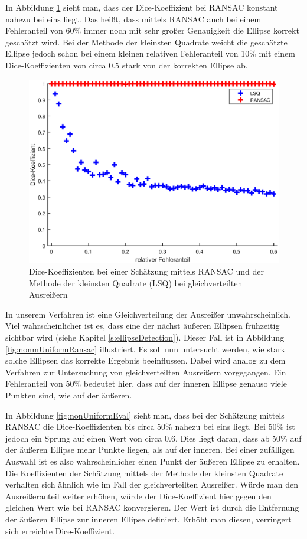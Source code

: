 {In Abbildung \ref{fig:uniformEval} sieht man, dass der Dice-Koeffizient bei RANSAC konstant nahezu bei eins liegt. Das heißt, dass mittels RANSAC auch bei einem Fehleranteil von 60\% immer noch mit sehr großer Genauigkeit die Ellipse korrekt geschätzt wird. Bei der Methode der kleinsten Quadrate weicht die geschätzte Ellipse jedoch schon bei einem kleinen relativen Fehleranteil von 10\% mit einem Dice-Koeffizienten von circa $0.5$ stark von der korrekten Ellipse ab.


\begin{figure}[!htb]
	\centering
	\includegraphics[width=\textwidth]{images/ransacEval0.eps}
	\caption{Dice-Koeffizienten bei einer Schätzung mittels RANSAC und der Methode der kleinsten Quadrate (LSQ) bei gleichverteilten Ausreißern}
	\label{fig:uniformEval}
\end{figure}

In unserem Verfahren ist eine Gleichverteilung der Ausreißer unwahrscheinlich. Viel wahrscheinlicher ist es, dass eine der nächst äußeren Ellipsen frühzeitig sichtbar wird (siehe Kapitel \ref{s:ellipseDetection}).
Dieser Fall ist in Abbildung \ref{fig:nonmUniformRansac} illustriert. Es soll nun untersucht werden, wie stark solche Ellipsen das korrekte Ergebnis beeinflussen. Dabei wird analog zu dem Verfahren zur Untersuchung von gleichverteilten Ausreißern vorgegangen. Ein Fehleranteil von 50\% bedeutet hier, dass auf der inneren Ellipse genauso viele Punkten sind, wie auf der äußeren.

In Abbildung \ref{fig:nonUniformEval} sieht man, dass bei der Schätzung mittels RANSAC die Dice-Koeffizienten bis circa 50\% nahezu bei eins liegt. Bei 50\% ist jedoch ein Sprung auf einen Wert von circa $0.6$. Dies liegt daran, dass ab 50\% auf der äußeren Ellipse mehr Punkte liegen, als auf der inneren. Bei einer zufälligen Auswahl ist es also wahrscheinlicher einen Punkt der äußeren Ellipse zu erhalten. Die Koeffizienten der Schätzung mittels der Methode der kleinsten Quadrate verhalten sich ähnlich wie im Fall der gleichverteilten Ausreißer. Würde man den Ausreißeranteil weiter erhöhen, würde der Dice-Koeffizient hier gegen den gleichen Wert wie bei RANSAC konvergieren. Der Wert ist durch die Entfernung der äußeren Ellipse zur inneren Ellipse definiert. Erhöht man diesen, verringert sich erreichte Dice-Koeffizient.

}
